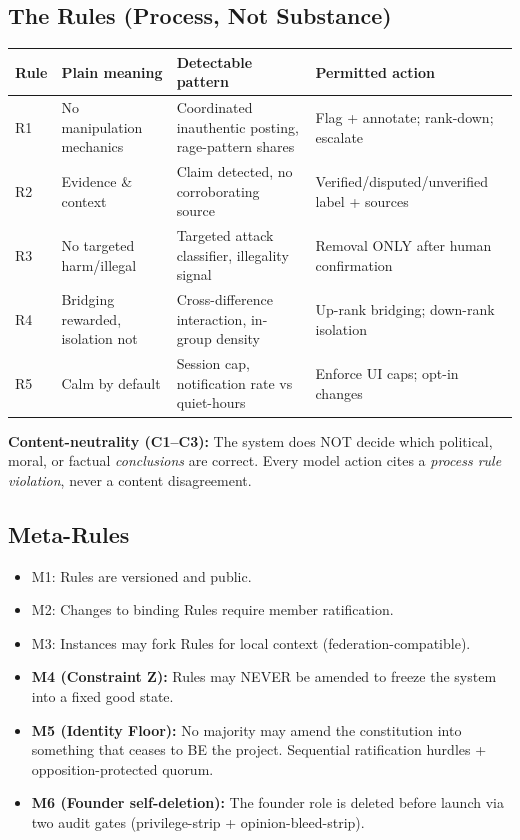 \documentclass[11pt,a4paper]{article}
\begin{document}
\subsection{The Rules (Process, Not Substance)}

\begin{table}[h]
\centering
\begin{tabular}{llll}
\toprule
Rule & Plain meaning & Detectable pattern & Permitted action \\
\midrule
R1  & No manipulation mechanics & Coordinated inauthentic posting, rage-pattern shares & Flag + annotate; rank-down; escalate \\
R2  & Evidence \& context & Claim detected, no corroborating source & Verified/disputed/unverified label + sources \\
R3  & No targeted harm/illegal & Targeted attack classifier, illegality signal & Removal ONLY after human confirmation \\
R4  & Bridging rewarded, isolation not & Cross-difference interaction, in-group density & Up-rank bridging; down-rank isolation \\
R5  & Calm by default & Session cap, notification rate vs quiet-hours & Enforce UI caps; opt-in changes \\
\bottomrule
\end{tabular}
\end{table}

\textbf{Content-neutrality (C1--C3):} The system does NOT decide which political,
moral, or factual \emph{conclusions} are correct. Every model action cites a
\emph{process rule violation}, never a content disagreement.

\subsection{Meta-Rules}

\begin{itemize}
    \item M1: Rules are versioned and public.
    \item M2: Changes to binding Rules require member ratification.
    \item M3: Instances may fork Rules for local context (federation-compatible).
    \item \textbf{M4 (Constraint Z):} Rules may NEVER be amended to freeze the
    system into a fixed good state.
    \item \textbf{M5 (Identity Floor):} No majority may amend the constitution
    into something that ceases to BE the project. Sequential ratification hurdles
    + opposition-protected quorum.
    \item \textbf{M6 (Founder self-deletion):} The founder role is deleted before
    launch via two audit gates (privilege-strip + opinion-bleed-strip).
\end{itemize}
\end{document}
